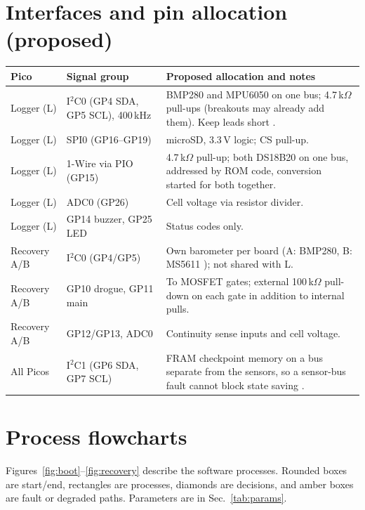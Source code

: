 \section{Interfaces and pin allocation (proposed)}
\small
{}
\begin{tabularx}{\linewidth}{@{}L{22mm}L{40mm}Y@{}}
\toprule{}\textbf{Pico}&\textbf{Signal group}&\textbf{Proposed allocation and notes}\\\midrule
Logger (L) & I$^2$C0 (GP4 SDA, GP5 SCL), 400\,kHz & BMP280 and MPU6050 on one bus; 4.7\,k$\Omega$ pull-ups (breakouts may already add them). Keep leads short \cite{i2cspec}.\\
Logger (L) & SPI0 (GP16--GP19) & microSD, 3.3\,V logic; CS pull-up.\\
Logger (L) & 1-Wire via PIO (GP15) & 4.7\,k$\Omega$ pull-up; both DS18B20 on one bus, addressed by ROM code, conversion started for both together.\\
Logger (L) & ADC0 (GP26) & Cell voltage via resistor divider.\\
Logger (L) & GP14 buzzer, GP25 LED & Status codes only.\\
Recovery A/B & I$^2$C0 (GP4/GP5) & Own barometer per board (A: BMP280, B: MS5611 \cite{ms5611ds}); not shared with L.\\
Recovery A/B & GP10 drogue, GP11 main & To MOSFET gates; external 100\,k$\Omega$ pull-down on each gate in addition to internal pulls.\\
Recovery A/B & GP12/GP13, ADC0 & Continuity sense inputs and cell voltage.\\
All Picos & I$^2$C1 (GP6 SDA, GP7 SCL) & FRAM checkpoint memory on a bus separate from the sensors, so a sensor-bus fault cannot block state saving \cite{fram}.\\
\bottomrule
\end{tabularx}
\normalsize

\section{Process flowcharts}
Figures~\ref{fig:boot}--\ref{fig:recovery} describe the software processes. Rounded boxes are start/end, rectangles are processes, diamonds are decisions, and amber boxes are fault or degraded paths. Parameters are in Sec.~\ref{tab:params}.

